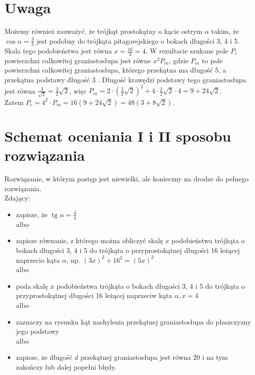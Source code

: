 \documentclass[10pt]{article}
\begin{document}
\section*{Uwaga}
Możemy również zauważyć, że trójkąt prostokątny o kącie ostrym $\alpha$ takim, że $\cos \alpha=\frac{3}{5}$ jest podobny do trójkąta pitagorejskiego o bokach długości 3, 4 i 5. Skala tego podobieństwa jest równa $x=\frac{16}{4}=4$. W rezultacie szukane pole $P_{c}$ powierzchni całkowitej graniastosłupa jest równe $x^{2} P_{m}$, gdzie $P_{m}$ to pole powierzchni całkowitej graniastosłupa, którego przekątna ma długość 5, a przekątna podstawy długość 3 . Długość krawędzi podstawy tego graniastosłupa jest równa $\frac{3}{\sqrt{2}}=\frac{3}{2} \sqrt{2}$, więc $P_{m}=2 \cdot\left(\frac{3}{2} \sqrt{2}\right)^{2}+4 \cdot \frac{3}{2} \sqrt{2} \cdot 4=9+24 \sqrt{2}$.\\
Zatem $P_{c}=4^{2} \cdot P_{m}=16(9+24 \sqrt{2})=48(3+8 \sqrt{2})$.

\section*{Schemat oceniania I i II sposobu rozwiązania}
Rozwiązanie, w którym postęp jest niewielki, ale konieczny na drodze do pełnego rozwiązania.\\
Zdający:

\begin{itemize}
  \item zapisze, że $\operatorname{tg} \alpha=\frac{4}{3}$\\
albo
  \item zapisze równanie, z którego można obliczyć skalę $x$ podobieństwa trójkąta o bokach długości 3, 4 i 5 do trójkąta o przyprostokątnej długości 16 leżącej naprzecio kąta $\alpha$, np. $(3 x)^{2}+16^{2}=(5 x)^{2}$\\
albo
  \item poda skalę $x$ podobieństwa trójkąta o bokach długości 3, 4 i 5 do trójkąta o przyprostokątnej długości 16 leżącej naprzeciw kąta $\alpha, x=4$\\
albo
  \item zaznaczy na rysunku kąt nachylenia przekątnej graniastosłupa do płaszczyzny jego podstawy\\
albo
  \item zapisze, że długość $d$ przekątnej graniastosłupa jest równa 20 i na tym zakończy lub dalej popełni błędy.
\end{itemize}
\end{document}
